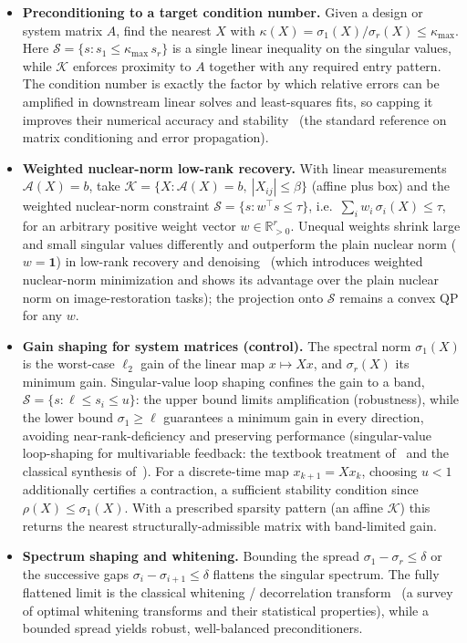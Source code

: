 \documentclass[journal]{IEEEtran}
\newcommand{\R}{\mathbb{R}}
\newcommand{\sgm}{\sigma}
\newcommand{\spec}{\mathcal{S}}
\newcommand{\Kset}{\mathcal{K}}
\begin{document}
\begin{itemize}
\item \textbf{Preconditioning to a target condition number.}
Given a design or system matrix $A$, find the nearest $X$ with
$\kappa(X) = \sgm_1(X)/\sgm_r(X) \le \kappa_{\max}$. Here
$\spec = \{ s : s_1 \le \kappa_{\max}\, s_r \}$ is a single linear
inequality on the singular values, while $\Kset$ enforces proximity to
$A$ together with any required entry pattern. The condition number is
exactly the factor by which relative errors can be amplified in
downstream linear solves and least-squares fits, so capping it improves
their numerical accuracy and stability~\cite[Ch.~2--3]{golub2013}
(the standard reference on matrix conditioning and error propagation).

\item \textbf{Weighted nuclear-norm low-rank recovery.}
With linear measurements $\mathcal{A}(X) = b$, take
$\Kset = \{ X : \mathcal{A}(X) = b,\ |X_{ij}| \le \beta \}$ (affine plus
box) and the weighted nuclear-norm constraint
$\spec = \{ s : w^\top s \le \tau \}$, i.e.\
$\sum_{i} w_i\,\sgm_i(X) \le \tau$, for an arbitrary positive weight
vector $w \in \R^r_{>0}$. Unequal weights shrink large and small
singular values differently and outperform the plain nuclear norm
($w = \mathbf{1}$) in low-rank recovery and denoising~\cite{gu2017wnnm}
(which introduces weighted nuclear-norm minimization and shows its
advantage over the plain nuclear norm on image-restoration tasks);
the projection onto $\spec$ remains a convex QP for any $w$.

\item \textbf{Gain shaping for system matrices (control).}
The spectral norm $\sgm_1(X)$ is the worst-case $\ell_2$ gain of the
linear map $x \mapsto Xx$, and $\sgm_r(X)$ its minimum gain.
Singular-value loop shaping confines the gain to a band,
$\spec = \{ s : \ell \le s_i \le u \}$: the upper bound limits
amplification (robustness), while the lower bound $\sgm_1 \ge \ell$
guarantees a minimum gain in every direction, avoiding
near-rank-deficiency and preserving performance (singular-value
loop-shaping for multivariable feedback: the textbook treatment
of~\cite{skogestad2005} and the classical synthesis of~\cite{doyle1981}).
For a discrete-time map $x_{k+1} = Xx_k$, choosing $u < 1$ additionally
certifies a contraction, a sufficient stability condition since
$\rho(X) \le \sgm_1(X)$. With a prescribed sparsity pattern (an affine
$\Kset$) this returns the nearest structurally-admissible matrix with
band-limited gain.

\item \textbf{Spectrum shaping and whitening.}
Bounding the spread $\sgm_1 - \sgm_r \le \delta$ or the successive gaps
$\sgm_i - \sgm_{i+1} \le \delta$ flattens the singular spectrum. The
fully flattened limit is the classical whitening / decorrelation
transform~\cite{kessy2018} (a survey of optimal whitening transforms and
their statistical properties), while a bounded spread yields robust,
well-balanced preconditioners.
\end{itemize}
\end{document}

